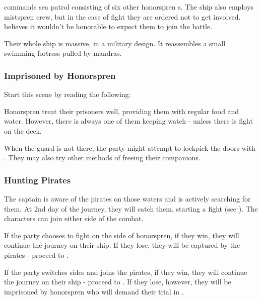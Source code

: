 \npcHonorsprenCaptain{} commands sea patrol consisting of six other honorspren \enemyTrueSpren{}s. The ship also employs mistspren crew, but in the case of fight they are ordered not to get involved. \npcHonorsprenCaptain{} believes it wouldn't be honorable to expect them to join the battle.

Their whole ship is massive, in a military design. It reassembles a small swimming fortress pulled by mandras.


\subsubsection{Imprisoned by Honorspren}
\label{ssec:sailingHonorsprenCptured}

Start this scene by reading the following:


Honorspren treat their prisoners well, providing them with regular food and water. However, there is always one of them keeping watch - unless there is fight on the deck.

When the guard is not there, the party might attempt to lockpick the doors with . They may also try other methods of freeing their companions.

\newpage
\subsubsection{Hunting Pirates}

The captain is aware of the pirates on those waters and is actively searching for them. At 2nd day of the journey, they will catch them, starting a fight (see ). The characters can join either side of the combat.

If the party chooses to fight on the side of honorspren, if they win, they will continue the journey on their ship. If they lose, they will be captured by the pirates - proceed to .

If the party switches sides and joins the pirates, if they win, they will continue the journey on their ship - proceed to . If they lose, however, they will be imprisoned by honorspren who will demand their trial in \locationFidelity{}.

